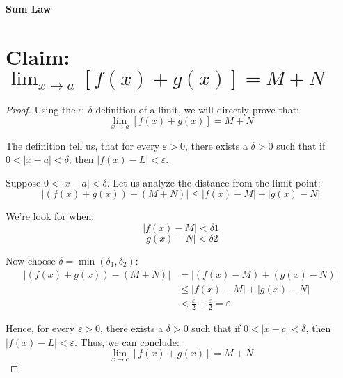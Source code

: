 \documentclass{article}
\begin{document}
	
\textbf{Sum Law}

\section*{Claim: $\lim_{x \to a} [f(x) + g(x)] = M + N$}


\begin{proof}


Using the $\varepsilon$–$\delta$ definition of a limit, we will directly prove that:
\[
\lim_{x \to a} [f(x) + g(x)] = M + N
\]

The definition tell us, that for every $\varepsilon > 0$, there exists a $\delta > 0$ such that if $0 < |x - a| < \delta$, then $|f(x) - L| < \varepsilon$.

Suppose $0 < |x - a| < \delta$. Let us analyze the distance from the limit point:
\[
| (f(x) + g(x)) - (M + N) | \leq |f(x) - M| + |g(x) - N|
\]

We're look for when:
\[
|f(x) - M| < \delta1
\]
\[
|g(x) - N| < \delta2
\]

Now choose $\delta = \min(\delta_1, \delta_2)$:
\[
\begin{aligned}
| (f(x) + g(x)) - (M + N) | 
&= | (f(x) - M) + (g(x) - N) | \\
&\leq |f(x) - M| + |g(x) - N| \\
&< \frac{\varepsilon}{2} + \frac{\varepsilon}{2} = \varepsilon
\end{aligned}
\]

Hence, for every $\varepsilon > 0$, there exists a $\delta > 0$ such that if $0 < |x - c| < \delta$, then 
$|f(x) - L| < \varepsilon$. Thus, we can conclude:
\[
\lim_{x \to c} [f(x) + g(x)] = M + N
\]





\end{proof}
\end{document}
